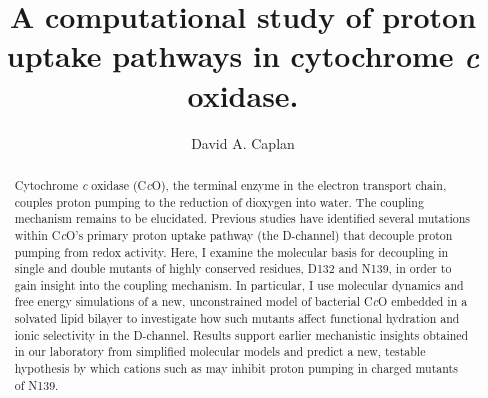 \documentclass[12pt,onehalfspaced]{ut-thesis}
\author{David A. Caplan}
\title{A computational study of proton uptake pathways in cytochrome \emph{c} oxidase.}
\begin{document}

\begin{preliminary}

\maketitle

\begin{abstract}
Cytochrome \emph{c} oxidase (C\emph{c}O), the terminal enzyme in the electron transport chain, couples proton pumping to the reduction of dioxygen into water. The coupling mechanism remains to be elucidated. Previous studies have identified several mutations within C\emph{c}O's primary proton uptake pathway (the D-channel) that decouple proton pumping from redox activity. Here, I examine the molecular basis for decoupling in single and double mutants of highly conserved residues, D132 and N139, in order to gain insight into the coupling mechanism. In particular, I use molecular dynamics and free energy simulations of a new, unconstrained model of bacterial C\emph{c}O embedded in a solvated lipid bilayer to investigate how such mutants affect functional hydration and ionic selectivity in the D-channel. Results support earlier mechanistic insights obtained in our laboratory from simplified molecular models and predict a new, testable hypothesis by which cations such as  may inhibit proton pumping in charged mutants of N139.
\end{abstract}



\tableofcontents

\listoftables

\listoffigures

\end{preliminary}
\end{document}
